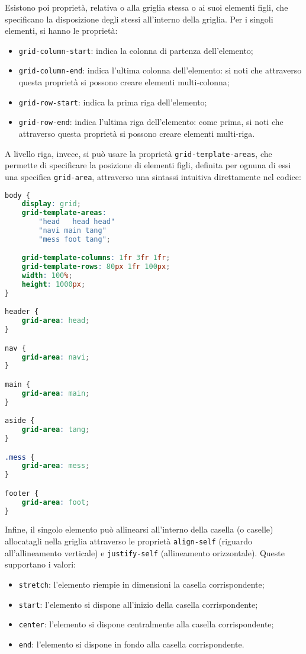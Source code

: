 \documentclass[a4paper,11pt]{article}
\begin{document}
Esistono poi proprietà, relativa o alla griglia stessa o ai suoi elementi figli, che specificano la disposizione degli stessi all'interno della griglia.
Per i singoli elementi, si hanno le proprietà:
\begin{itemize}
	\item \lstinline|grid-column-start|: indica la colonna di partenza dell'elemento;
	\item \lstinline|grid-column-end|: indica l'ultima colonna dell'elemento: si noti che attraverso questa proprietà si possono creare elementi multi-colonna;
	\item \lstinline|grid-row-start|: indica la prima riga dell'elemento;
	\item \lstinline|grid-row-end|: indica l'ultima riga dell'elemento: come prima, si noti che attraverso questa proprietà si possono creare elementi multi-riga.
\end{itemize}

A livello riga, invece, si può usare la proprietà \lstinline|grid-template-areas|, che permette di specificare la posizione di elementi figli, definita per ognuna di essi una specifica \lstinline|grid-area|, attraverso una sintassi intuitiva direttamente nel codice:

\begin{lstlisting}[language=css, style=codestyle]	
body {
	display: grid;
	grid-template-areas:
		"head	head head"
		"navi main tang"
		"mess foot tang";

	grid-template-columns: 1fr 3fr 1fr;
	grid-template-rows: 80px 1fr 100px;
	width: 100%;
	height: 1000px;
}

header {
	grid-area: head;
}

nav {
	grid-area: navi;
}

main {
	grid-area: main;
}

aside {
	grid-area: tang;
}

.mess {
	grid-area: mess;
}

footer {
	grid-area: foot;
}
\end{lstlisting}

Infine, il singolo elemento può allinearsi all'interno della casella (o caselle) allocatagli nella griglia attraverso le proprietà \lstinline|align-self| (riguardo all'allineamento verticale) e \lstinline|justify-self| (allineamento orizzontale). Queste supportano i valori:
\begin{itemize}
	\item \lstinline|stretch|: l'elemento riempie in dimensioni la casella corrispondente;
	\item \lstinline|start|: l'elemento si dispone all'inizio della casella corrispondente;
	\item \lstinline|center|: l'elemento si dispone centralmente alla casella corrispondente;
	\item \lstinline|end|: l'elemento si dispone in fondo alla casella corrispondente.
\end{itemize}
\end{document}

